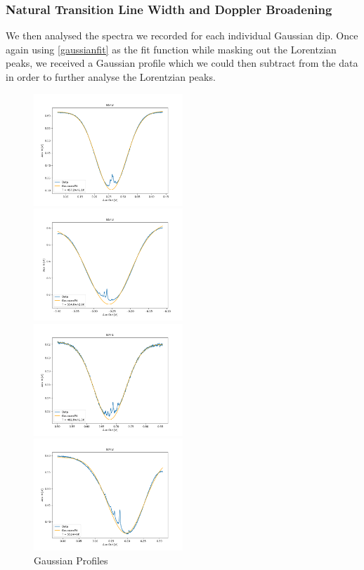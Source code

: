 \documentclass[12pt, a4paper]{article}
\begin{document}
\subsubsection{Natural Transition Line Width and Doppler Broadening}

We then analysed the spectra we recorded for each individual Gaussian dip. Once again using \autoref{gaussianfit} as the fit function while masking out the Lorentzian peaks, we received a Gaussian profile which we could then subtract from the data in order to further analyse the Lorentzian peaks.

\begin{figure}
    \centering
    \parbox{0.45\textwidth}{
        \includegraphics[width=0.5\textwidth]{gaussian1.png}
    }
    \hfill
    \parbox{0.45\textwidth}{
        \includegraphics[width=0.5\textwidth]{gaussian2.png}
    }
    \parbox{0.45\textwidth}{
        \includegraphics[width=0.5\textwidth]{gaussian3.png}
    }
    \hfill
    \parbox{0.45\textwidth}{
        \includegraphics[width=0.5\textwidth]{gaussian4.png}
    }
    \caption{Gaussian Profiles}
    \label{gaussianprofiles}
\end{figure}
\end{document}
